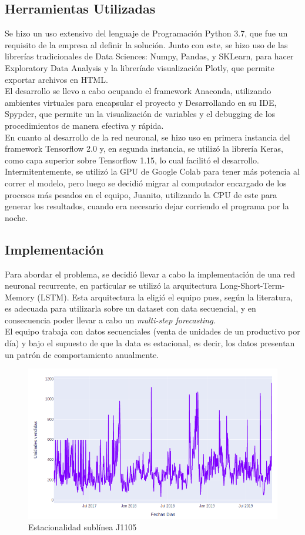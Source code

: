 \documentclass[12pt]{article}
\begin{document}
\subsection{Herramientas Utilizadas}
Se hizo un uso extensivo del lenguaje de Programación Python 3.7, que fue un requisito de la empresa al definir la solución. Junto con este, se hizo uso de las librerías tradicionales de Data Sciences: Numpy, Pandas, y SKLearn, para hacer Exploratory Data Analysis y la libreríade visualización Plotly, que permite exportar archivos en HTML. \\
El desarrollo se llevo a cabo ocupando el framework Anaconda, utilizando ambientes virtuales para encapsular el proyecto y Desarrollando en su IDE, Spypder, que permite un la visualización de variables y el debugging de los procedimientos de manera efectiva y rápida.\\
En cuanto al desarrollo de la red neuronal, se hizo uso en primera instancia del framework Tensorflow 2.0 y, en segunda instancia, se utilizó la librería Keras, como capa superior sobre Tensorflow 1.15, lo cual facilitó el desarrollo.\\
Intermitentemente, se utilizó la GPU de Google Colab para tener más potencia al correr el modelo, pero luego se decidió migrar al computador encargado de los procesos más pesados en el equipo, Juanito, utilizando la CPU de este para generar los resultados, cuando era necesario dejar corriendo el programa por la noche.
\subsection{Implementación}
Para abordar el problema, se decidió llevar a cabo la implementación de una red neuronal recurrente, en particular se utilizó la arquitectura Long-Short-Term-Memory (LSTM). Esta arquitectura la eligió el equipo pues, según la literatura, es adecuada para utilizarla sobre un dataset con data secuencial, y en consecuencia poder llevar a cabo un \textit{multi-step forecasting}.\\
El equipo trabaja con datos secuenciales (venta de unidades de un productivo por día) y bajo el supuesto de que la data es estacional, es decir, los datos presentan un patrón de comportamiento anualmente.
\begin{figure}
    \centering
    \includegraphics[scale=0.5]{estacionalidad-telefonia.png}
    \caption{Estacionalidad sublínea J1105}
    \label{fig:my_label}
\end{figure}
\end{document}
